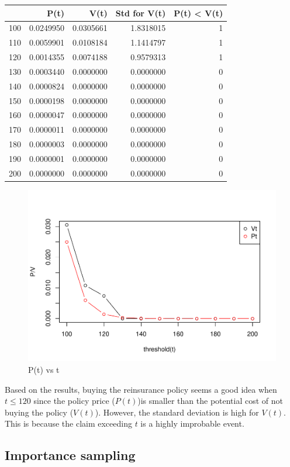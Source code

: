 \documentclass[11pt,]{article}
\begin{document}
\begin{longtable}[]{@{}lrrrr@{}}
\toprule
& P(t) & V(t) & Std for V(t) & P(t) \textless{} V(t)\tabularnewline
\midrule
\endhead
100 & 0.0249950 & 0.0305661 & 1.8318015 & 1\tabularnewline
110 & 0.0059901 & 0.0108184 & 1.1414797 & 1\tabularnewline
120 & 0.0014355 & 0.0074188 & 0.9579313 & 1\tabularnewline
130 & 0.0003440 & 0.0000000 & 0.0000000 & 0\tabularnewline
140 & 0.0000824 & 0.0000000 & 0.0000000 & 0\tabularnewline
150 & 0.0000198 & 0.0000000 & 0.0000000 & 0\tabularnewline
160 & 0.0000047 & 0.0000000 & 0.0000000 & 0\tabularnewline
170 & 0.0000011 & 0.0000000 & 0.0000000 & 0\tabularnewline
180 & 0.0000003 & 0.0000000 & 0.0000000 & 0\tabularnewline
190 & 0.0000001 & 0.0000000 & 0.0000000 & 0\tabularnewline
200 & 0.0000000 & 0.0000000 & 0.0000000 & 0\tabularnewline
\bottomrule
\end{longtable}

\begin{figure}
\centering
\includegraphics{figs/unnamed-chunk-21.pdf}
\caption{P(t) vs t}
\end{figure}

Based on the results, buying the reinsurance policy seems a good idea
when \(t\leq120\) since the policy price (\(P(t)\))is smaller than the
potential cost of not buying the policy (\(V(t)\)). However, the
standard deviation is high for \(V(t)\). This is because the claim
exceeding \(t\) is a highly improbable event.

\hypertarget{importance-sampling}{%
\subsection{Importance sampling}\label{importance-sampling}}
\end{document}
